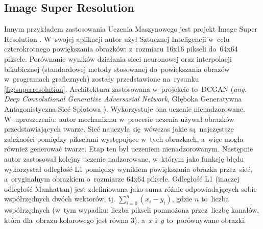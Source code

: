 \documentclass[oneside, 11pt, a4paper]{article}
\begin{document}
\begin{multicols}{2}
\subsection{Image Super Resolution}
Innym przykładem zastosowania Uczenia Maszynowego jest projekt Image Super Resolution \cite{SuperResolution}. W~swojej aplikacji autor użył Sztucznej Inteligencji w~celu czterokrotnego powiększania obrazków: z~rozmiaru 16x16 pikseli do~64x64 piksele. Porównanie wyników działania sieci neuronowej oraz interpolacji bikubicznej (standardowej metody stosowanej do~powiększania obrazów w~programach graficznych) zostały przedstawione na~rysunku \ref{fig:superresolution}.
Architektura zastosowana w~projekcie to~DCGAN (\textit{ang. Deep Convolutional Generative Adversarial Network}, Głęboka Generatywna Antagonistyczna Sieć Splotowa \cite{DBLP:journals/corr/RadfordMC15}). Wykorzystuje ona uczenie nienadzorowane.
W~uproszczeniu: autor mechanizmu w~procesie uczenia używał obrazków przedstawiających twarze. Sieć nauczyła się~wówczas jakie są~najczęstsze zależności pomiędzy pikselami występujące w~tych obrazkach, a~więc mogła również generować twarze.
Etap ten był uczeniem nienadzorowanym. Następnie autor zastosował kolejny uczenie nadzorowane, w~którym jako funkcję błędu wykorzystał odległość L1 pomiędzy wynikiem powiększania obrazka przez~sieć, a~oryginalnym obrazkiem o~rozmiarze 64x64 piksele. Odległość L1 (inaczej odległość Manhattan) jest zdefiniowana jako suma różnic odpowiadających sobie współrzędnych dwóch wektorów, tj. $\sum\limits_{i=0}^n (x_i - y_i)$, gdzie $n$ to~liczba współrzędnych (w~tym wypadku: liczba pikseli pomnożona przez~liczbę kanałów, która dla~obrazu kolorowego jest równa 3), a~$x$ i~$y$ to~porównywane obrazki.


\end{multicols}
\end{document}
